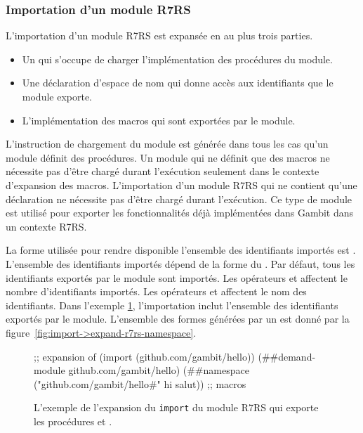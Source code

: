 \subsubsection{Importation d'un module R7RS}

L'importation d'un module R7RS est expansée en au plus trois parties.
\begin{itemize}

  \item Un  qui s'occupe de charger l'implémentation des
    procédures du module.

  \item Une déclaration d'espace de nom qui donne accès aux identifiants que le
    module exporte.

  \item L'implémentation des macros qui sont exportées par le module.
\end{itemize}

L'instruction de chargement du module est générée dans tous les cas qu'un
module définit des procédures. Un module qui ne définit que des macros ne
nécessite pas d'être chargé durant l'exécution seulement dans le contexte
d'expansion des macros. L'importation d'un module R7RS qui ne contient qu'une
déclaration  ne nécessite pas d'être chargé durant l'exécution.
Ce type de module est utilisé pour exporter les fonctionnalités déjà
implémentées dans Gambit dans un contexte R7RS.

La forme utilisée pour rendre disponible l'ensemble des identifiants importés
est . L'ensemble des identifiants importés dépend de la
forme du . Par défaut, tous les identifiants exportés par le
module sont importés.  Les opérateurs  et 
affectent le nombre d'identifiants importés. Les opérateurs  et
 affectent le nom des identifiants.  Dans l'exemple
\ref{fig:import->expand-r7rs}, l'importation inclut l'ensemble des identifiants
exportés par le module. L'ensemble des formes  générées par
un  est donné par la
figure~\ref{fig:import->expand-r7rs-namespace}.
\\

\begin{figure}[ht]
  \centering
  \begin{mplisting}{1}
;; expansion of (import (github.com/gambit/hello))
(##demand-module github.com/gambit/hello)
(##namespace ("github.com/gambit/hello#" hi salut))
;; macros
\end{mplisting}
  \caption{L'exemple de l'expansion du \texttt{import} du module R7RS
     qui exporte les procédures
     et .}
  \label{fig:import->expand-r7rs}
\end{figure}


